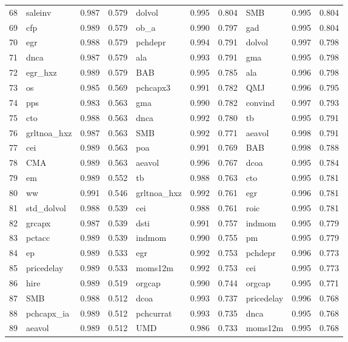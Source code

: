 \begin{landscape}
\begin{footnotesize}
\begin{longtable}{l|lcc|lcc|lcc}
  68 & saleinv & 0.987 & 0.579 & dolvol & 0.995 & 0.804 & SMB & 0.995 & 0.804 \\ 
  69 & cfp & 0.989 & 0.579 & ob\_a & 0.990 & 0.797 & gad & 0.995 & 0.804 \\ 
  70 & egr & 0.988 & 0.579 & pchdepr & 0.994 & 0.791 & dolvol & 0.997 & 0.798 \\ 
  71 & dnca & 0.987 & 0.579 & ala & 0.993 & 0.791 & gma & 0.995 & 0.798 \\ 
  72 & egr\_hxz & 0.989 & 0.579 & BAB & 0.995 & 0.785 & ala & 0.996 & 0.798 \\ 
  73 & os & 0.985 & 0.569 & pchcapx3 & 0.991 & 0.782 & QMJ & 0.996 & 0.795 \\ 
  74 & pps & 0.983 & 0.563 & gma & 0.990 & 0.782 & convind & 0.997 & 0.793 \\ 
  75 & cto & 0.988 & 0.563 & dnca & 0.992 & 0.780 & tb & 0.995 & 0.791 \\ 
  76 & grltnoa\_hxz & 0.987 & 0.563 & SMB & 0.992 & 0.771 & aeavol & 0.998 & 0.791 \\ 
  77 & cei & 0.989 & 0.563 & poa & 0.991 & 0.769 & BAB & 0.998 & 0.788 \\ 
  78 & CMA & 0.989 & 0.563 & aeavol & 0.996 & 0.767 & dcoa & 0.995 & 0.784 \\ 
  79 & em & 0.989 & 0.552 & tb & 0.988 & 0.763 & cto & 0.995 & 0.781 \\ 
  80 & ww & 0.991 & 0.546 & grltnoa\_hxz & 0.992 & 0.761 & egr & 0.996 & 0.781 \\ 
  81 & std\_dolvol & 0.988 & 0.539 & cei & 0.988 & 0.761 & roic & 0.995 & 0.781 \\ 
  82 & grcapx & 0.987 & 0.539 & dsti & 0.991 & 0.757 & indmom & 0.995 & 0.779 \\ 
  83 & pctacc & 0.989 & 0.539 & indmom & 0.990 & 0.755 & pm & 0.995 & 0.779 \\ 
  84 & ep & 0.989 & 0.533 & egr & 0.992 & 0.753 & pchdepr & 0.996 & 0.773 \\ 
  85 & pricedelay & 0.989 & 0.533 & moms12m & 0.992 & 0.753 & cei & 0.995 & 0.773 \\ 
  86 & hire & 0.989 & 0.519 & orgcap & 0.990 & 0.744 & orgcap & 0.995 & 0.771 \\ 
  87 & SMB & 0.988 & 0.512 & dcoa & 0.993 & 0.737 & pricedelay & 0.996 & 0.768 \\ 
  88 & pchcapx\_ia & 0.989 & 0.512 & pchcurrat & 0.993 & 0.735 & dnca & 0.995 & 0.768 \\ 
  89 & aeavol & 0.989 & 0.512 & UMD & 0.986 & 0.733 & moms12m & 0.995 & 0.768 \\ 

\end{longtable}
\end{footnotesize}
\end{landscape}
